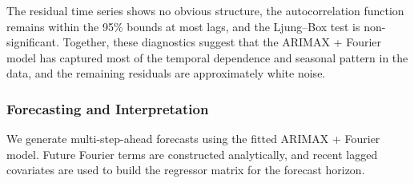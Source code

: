 \documentclass[
]{article}
\newenvironment{Shaded}{\begin{snugshade}}{\end{snugshade}}
\newcommand{\AttributeTok}[1]{\textcolor[rgb]{0.13,0.29,0.53}{#1}}
\newcommand{\DecValTok}[1]{\textcolor[rgb]{0.00,0.00,0.81}{#1}}
\newcommand{\FunctionTok}[1]{\textcolor[rgb]{0.13,0.29,0.53}{\textbf{#1}}}
\newcommand{\NormalTok}[1]{#1}
\newcommand{\OtherTok}[1]{\textcolor[rgb]{0.56,0.35,0.01}{#1}}
\newcommand{\SpecialCharTok}[1]{\textcolor[rgb]{0.81,0.36,0.00}{\textbf{#1}}}
\newcommand{\StringTok}[1]{\textcolor[rgb]{0.31,0.60,0.02}{#1}}
\begin{document}
The residual time series shows no obvious structure, the autocorrelation
function remains within the 95\% bounds at most lags, and the Ljung--Box
test is non-significant. Together, these diagnostics suggest that the
ARIMAX + Fourier model has captured most of the temporal dependence and
seasonal pattern in the data, and the remaining residuals are
approximately white noise.

\subsubsection{Forecasting and
Interpretation}\label{forecasting-and-interpretation}

We generate multi-step-ahead forecasts using the fitted ARIMAX + Fourier
model. Future Fourier terms are constructed analytically, and recent
lagged covariates are used to build the regressor matrix for the
forecast horizon.

\begin{Shaded}
\end{Shaded}
\end{document}

